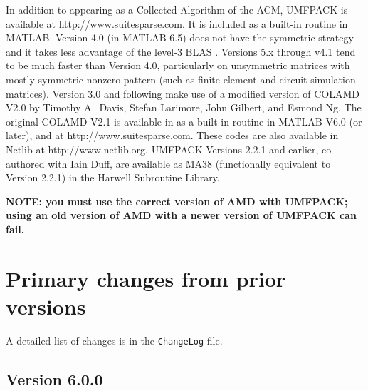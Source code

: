 \documentclass[11pt]{article}
\begin{document}
In addition to appearing as a Collected Algorithm of the ACM,
UMFPACK is available at \newline http://www.suitesparse.com.
It is included as a built-in routine in MATLAB.
Version 4.0 (in MATLAB 6.5)
does not have the symmetric strategy and it takes
less advantage of the level-3
BLAS \cite{DaydeDuff99,ACM679a,ATLAS,GotoVandeGeijn02}.
Versions 5.x through v4.1 tend to be much faster than Version 4.0,
particularly on unsymmetric matrices with mostly symmetric
nonzero pattern (such as finite element and circuit simulation matrices).
Version 3.0 and following make
use of a modified version of COLAMD V2.0 by Timothy A.~Davis, Stefan
Larimore, John Gilbert, and Esmond Ng.  The original COLAMD V2.1 is available in
as a built-in routine in MATLAB V6.0 (or later), and at
http://www.suitesparse.com.
These codes are also available in Netlib \cite{netlib} at
http://www.netlib.org.
UMFPACK Versions 2.2.1 and earlier, co-authored with Iain Duff,
are available as
MA38 (functionally equivalent to Version 2.2.1) in the Harwell
Subroutine Library.

{\bf NOTE: you must use the correct version of AMD with UMFPACK; using
an old version of AMD with a newer version of UMFPACK can fail.}

\section{Primary changes from prior versions}

A detailed list of changes is in the {\tt ChangeLog} file.

\subsection{Version 6.0.0}
\end{document}
